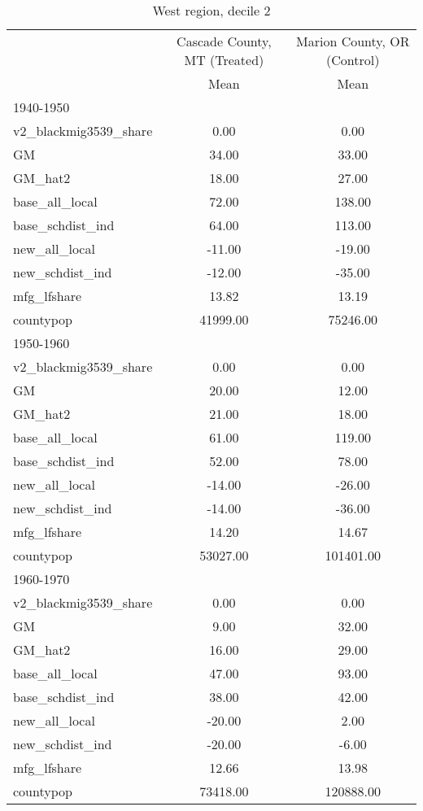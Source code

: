 \begin{table}[htbp]\centering
\def\sym#1{\ifmmode^{#1}\else\(^{#1}\)\fi}
\caption{West region, decile 2 \label{tab1}}
\begin{tabular}{l*{2}{c}}
\toprule
                    &\multicolumn{1}{c}{Cascade County, MT (Treated)}&\multicolumn{1}{c}{Marion County, OR (Control)}\\
                    &        Mean&        Mean\\
\midrule
1940-1950           &            &            \\
v2\_blackmig3539\_share&        0.00&        0.00\\
GM                  &       34.00&       33.00\\
GM\_hat2             &       18.00&       27.00\\
base\_all\_local      &       72.00&      138.00\\
base\_schdist\_ind    &       64.00&      113.00\\
new\_all\_local       &      -11.00&      -19.00\\
new\_schdist\_ind     &      -12.00&      -35.00\\
mfg\_lfshare         &       13.82&       13.19\\
countypop           &    41999.00&    75246.00\\
\midrule
1950-1960           &            &            \\
v2\_blackmig3539\_share&        0.00&        0.00\\
GM                  &       20.00&       12.00\\
GM\_hat2             &       21.00&       18.00\\
base\_all\_local      &       61.00&      119.00\\
base\_schdist\_ind    &       52.00&       78.00\\
new\_all\_local       &      -14.00&      -26.00\\
new\_schdist\_ind     &      -14.00&      -36.00\\
mfg\_lfshare         &       14.20&       14.67\\
countypop           &    53027.00&   101401.00\\
\midrule
1960-1970           &            &            \\
v2\_blackmig3539\_share&        0.00&        0.00\\
GM                  &        9.00&       32.00\\
GM\_hat2             &       16.00&       29.00\\
base\_all\_local      &       47.00&       93.00\\
base\_schdist\_ind    &       38.00&       42.00\\
new\_all\_local       &      -20.00&        2.00\\
new\_schdist\_ind     &      -20.00&       -6.00\\
mfg\_lfshare         &       12.66&       13.98\\
countypop           &    73418.00&   120888.00\\
\bottomrule
\end{tabular}
\end{table}
